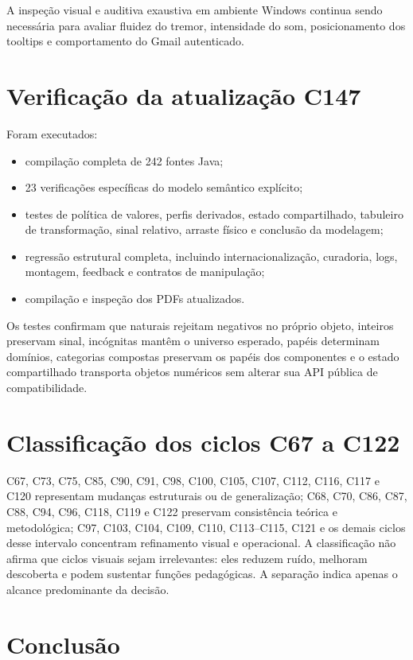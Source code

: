\documentclass[12pt,a4paper]{article}
\begin{document}
A inspeção visual e auditiva exaustiva em ambiente Windows continua sendo necessária para avaliar fluidez do tremor, intensidade do som, posicionamento dos tooltips e comportamento do Gmail autenticado.


\section{Verificação da atualização C147}

Foram executados:
\begin{itemize}[noitemsep]
  \item compilação completa de 242 fontes Java;
  \item 23 verificações específicas do modelo semântico explícito;
  \item testes de política de valores, perfis derivados, estado compartilhado, tabuleiro de transformação, sinal relativo, arraste físico e conclusão da modelagem;
  \item regressão estrutural completa, incluindo internacionalização, curadoria, logs, montagem, feedback e contratos de manipulação;
  \item compilação e inspeção dos PDFs atualizados.
\end{itemize}

Os testes confirmam que naturais rejeitam negativos no próprio objeto, inteiros preservam sinal, incógnitas mantêm o universo esperado, papéis determinam domínios, categorias compostas preservam os papéis dos componentes e o estado compartilhado transporta objetos numéricos sem alterar sua API pública de compatibilidade.

\section{Classificação dos ciclos C67 a C122}

C67, C73, C75, C85, C90, C91, C98, C100, C105, C107, C112, C116, C117 e C120 representam mudanças estruturais ou de generalização; C68, C70, C86, C87, C88, C94, C96, C118, C119 e C122 preservam consistência teórica e metodológica; C97, C103, C104, C109, C110, C113--C115, C121 e os demais ciclos desse intervalo concentram refinamento visual e operacional. A classificação não afirma que ciclos visuais sejam irrelevantes: eles reduzem ruído, melhoram descoberta e podem sustentar funções pedagógicas. A separação indica apenas o alcance predominante da decisão.

\section{Conclusão}
\end{document}
